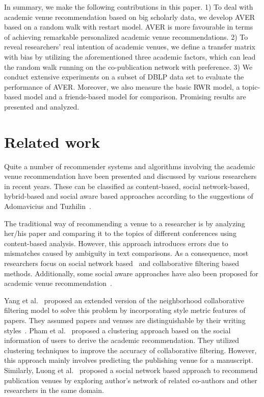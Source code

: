\documentclass[9pt]{acm_proc_article-sp}
\begin{document}
In summary, we make the following contributions in this paper. 1) To deal with academic venue recommendation based on big scholarly data, we develop AVER based on a random walk with restart model. AVER is more favourable in terms of achieving remarkable personalized academic venue recommendations. 2) To reveal researchers' real intention of academic venues, we define a transfer matrix with bias by utilizing the aforementioned three academic factors, which can lead the random walk running on the co-publication network with preference. 3) We conduct extensive experiments on a subset of DBLP data set to evaluate the performance of AVER. Moreover, we also measure the basic RWR model, a topic-based model and a friends-based model for comparison. Promising results are presented and analyzed.

\section{Related work}
Quite a number of recommender systems and algorithms involving the academic venue recommendation have been presented and discussed by various researchers in recent years. These can be classified as content-based, social network-based, hybrid-based and social aware based approaches according to the suggestions of Adomavicius and Tuzhilin~\cite{adomavicius2005toward}.

The traditional way of recommending a venue to a researcher is by analyzing her/his paper and comparing it to the topics of different conferences using content-based analysis. However, this approach introduces errors due to mismatches caused by ambiguity in text comparisons. As a consequence, most researchers focus on social network based~\cite{luong2012publication,chen2012social} and collaborative filtering based~\cite{pham2011clustering,yang2012venue} methods. Additionally, some social aware approaches have also been proposed for academic venue recommendation~\cite{asabere2014improving,xia2013socially,hornick2012extending}.

Yang et al.~\cite{yang2012venue} proposed an extended version of the neighborhood collaborative filtering model to solve this problem by incorporating style metric features of papers. They assumed papers and venues are distinguishable by their writing styles~\cite{yang2012distinguishing}. Pham et al.~\cite{pham2011clustering} proposed a clustering approach based on the social information of users to derive the academic recommendation. They utilized clustering techniques to improve the accuracy of collaborative filtering. However, this approach mainly involves predicting the publishing venue for a manuscript. Similarly, Luong et al.~\cite{luong2012publication} proposed a social network based approach to recommend publication venues by exploring author's network of related co-authors and other researchers in the same domain.
\end{document}
